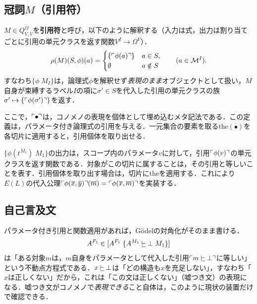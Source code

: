 \documentclass[../../main-detail.tex]{subfiles}
\begin{document}
\subsection{冠詞$M$（引用符）}\label{subsec:M-article}
\begin{definition}
    $M \in Q^\Omega_{V,V}$を\textbf{引用符}と呼び，以下のように解釈する（入力は式，出力は割り当てごとに引用の単元クラスを返す関数$V^I\to\Omega^V$）．
    \[
        \rho(M)(S,\phi)(a)=
        \begin{cases}
            \{\ulcorner \phi(a) \urcorner\} & a\in S,\\
            \emptyset & a\notin S
        \end{cases}\qquad(a\in\mathcal M^I).
    \]
    すなわち$\{\phi\; M_I\}$は，論理式$\phi$を解釈せず\emph{表現のまま}オブジェクトとして扱い，$M$自身が束縛するラベル$I$の項に$\sigma'\in S$を代入した引用の単元クラスの族$\sigma' \mapsto \{\ulcorner \phi(\sigma') \urcorner\}$を返す．

    ここで，$\ulcorner \bullet \urcorner$は，コノメノの表現を個体として埋め込むメタ記法である．この定義は，パラメータ付き論理式の引用を与える．一元集合の要素を取る$\mathrm{the}(\bullet)$を各切片に適用すると，引用個体を取り出せる．
\end{definition}

\begin{remark}
    $\{\phi(t^{M_1})\; M_1\}$の出力は，スコープ内のパラメータ$v$に対して，引用$\ulcorner \phi(v) \urcorner$の単元クラスを返す関数である．対象がこの切片に属することは，その引用と等しいことを表す．引用個体を取り出す場合は，切片に$\mathrm{the}$を適用する．これにより$E(L)$の代入公理$\ulcorner \phi(\overline{x},\overline{y}) \urcorner(\overline{m}) = \ulcorner \phi(\overline{x},\overline{m}) \urcorner$を実装する．
\end{remark}

\subsection{自己言及文}\label{subsec:self-reference}
パラメータ付き引用と関数適用があれば，Gödelの対角化がそのまま書ける．
\[
    A^{F_1} \in [A^{F_1}\; \{A^{M_1} \mathrel{\underline{\vdash}} \bot\; M_1\}]
\]
は「ある対象$m$は，$m$自身をパラメータとして代入した引用$\ulcorner m \mathrel{\underline{\vdash}} \bot \urcorner$に等しい」という不動点方程式である．$x \mathrel{\underline{\vdash}} \bot$は「どの構造も$x$を充足しない」，すなわち「$x$は正しくない」だから，これは「この文は正しくない」（嘘つき文）の表現になる．嘘つき文がコノメノで\emph{表現できる}こと自体は，このように現状の装置だけで確認できる．
\end{document}
